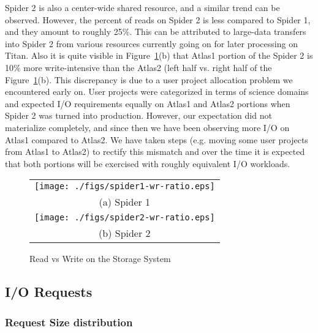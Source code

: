 Spider 2 is also a center-wide shared resource, and a similar trend can be
observed. However, the percent of reads on Spider 2 is less compared to Spider
1, and they amount to roughly 25\%. This can be attributed to large-data
transfers into Spider 2 from various resources currently going on for later
processing on Titan. Also it is quite visible in Figure~\ref{fig:rwratio}(b)
that Atlas1 portion of the Spider 2 is 10\% more write-intensive than the
Atlas2 (left half vs. right half of the Figure~\ref{fig:rwratio}(b). This
discrepancy is due to a user project allocation problem we encountered early
on. User projects were categorized in terms of science domains and expected I/O
requirements equally on Atlas1 and Atlas2 portions when Spider 2 was turned
into production. However, our expectation did not materialize completely, and
since then we have been observing more I/O on Atlas1 compared to Atlas2. We
have taken steps (e.g. moving some user projects from Atlas1 to Atlas2) to
rectify this mismatch and over the time it is expected that both portions will
be exercised with roughly equivalent I/O workloads. 

\begin{figure}[!t]
\begin{center}
\begin{tabular}{c}
{\texttt{[image: ./figs/spider1-wr-ratio.eps]}}\\
{(a) Spider 1}\\
{\texttt{[image: ./figs/spider2-wr-ratio.eps]}}\\
{(b) Spider 2}\\
\end{tabular}
\vspace{-0.1in}
\caption{Read vs Write on the Storage System}
\label{fig:rwratio}
\end{center}
\end{figure}


\subsection{I/O Requests}
\subsubsection{Request Size distribution}



